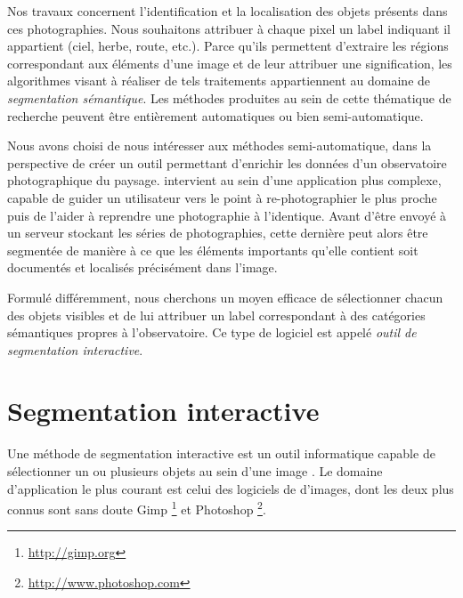 Nos travaux concernent l'identification et la localisation des objets présents dans ces photographies. Nous souhaitons attribuer à chaque pixel un label indiquant  il appartient (ciel, herbe, route, etc.). Parce qu'ils permettent d'extraire les régions correspondant aux éléments d'une image et de leur attribuer une signification, les algorithmes visant à réaliser de tels traitements appartiennent au domaine de \emph{ segmentation sémantique}. Les méthodes produites au sein de cette thématique de recherche peuvent être entièrement automatiques ou bien semi-automatique. 

Nous avons choisi de nous intéresser aux méthodes semi-automatique, dans la perspective de créer un outil permettant d'enrichir les données d'un observatoire photographique du paysage.  intervient au sein d'une application plus complexe, capable de guider un utilisateur vers le point à re-photographier le plus proche puis de l'aider à reprendre une photographie à l'identique. Avant d'être envoyé à un serveur stockant les séries de photographies, cette dernière peut alors être segmentée de manière à ce que les éléments importants qu'elle contient soit documentés et localisés précisément dans l'image. 

Formulé différemment, nous cherchons un moyen  efficace de sélectionner chacun des objets visibles et de lui attribuer un label correspondant à des catégories sémantiques propres à l'observatoire. Ce type de logiciel est appelé \emph{outil de segmentation interactive}.


\section{Segmentation interactive }

Une méthode de segmentation interactive est un outil informatique capable de sélectionner un ou plusieurs objets au sein d'une image . Le domaine d'application le plus courant  est celui des logiciels de  d'images, dont les deux plus connus sont sans doute Gimp \footnote{\url{http://gimp.org}} et Photoshop \footnote{\url{http://www.photoshop.com}}. 


